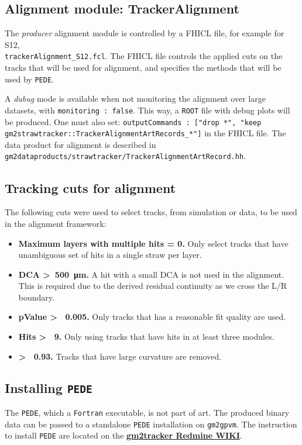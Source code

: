 \documentclass[12pt]{article}
\begin{document}
\clearpage
\subsection{Alignment module: TrackerAlignment} 
The \textit{producer} alignment module is controlled by a FHICL file, for example for S12, \\\verb!trackerAlignment_S12.fcl!. The FHICL file controls the applied cuts on the tracks that will be used for alignment, and specifies the methods that will be used by \texttt{PEDE}.

A \textit{dubug} mode is available when not monitoring the alignment over large datasets, with \verb!monitoring : false!. This way, a \verb!ROOT! file with debug plots will be produced. One must also set:
\lstinline{outputCommands : ["drop *", "keep gm2strawtracker::TrackerAlignmentArtRecords_*"]}
in the FHICL file. The data product for alignment is described in \\ \verb!gm2dataproducts/strawtracker/TrackerAlignmentArtRecord.hh!.   

\subsection{Tracking cuts for alignment}
The following cuts were used to select tracks, from simulation or data, to be used in the alignment framework:
\begin{itemize}
    \item \textbf{Maximum layers with multiple hits = 0.} Only select tracks that have unambiguous set of hits in a single straw per layer. 
    \item \textbf{DCA \textgreater~\SI{500}{\micro\metre}.} A hit with a small DCA is not used in the alignment. This is required due to the derived residual continuity as we cross the L/R boundary.
    \item \textbf{pValue \textgreater~ 0.005.} Only tracks that has a reasonable fit quality are used. 
    \item \textbf{Hits \textgreater~ 9.} Only using tracks that have hits in at least three modules. 
    \item \textbf{ \textgreater~ 0.93.} Tracks that have large curvature are removed.
\end{itemize}

\subsection{Installing \texttt{PEDE}} 
The \texttt{PEDE}, which a \texttt{Fortran} executable, is not part of art. The produced binary data can be passed to a standalone \texttt{PEDE} installation on \texttt{gm2gpvm}. The instruction to install \texttt{PEDE} are located on the \textbf{\href{https://cdcvs.fnal.gov/redmine/projects/gm2tracker/wiki/Tracker_Alignment_MC_with_Millipede_II_Framework}{gm2tracker Redmine WIKI}}. 
\end{document}

